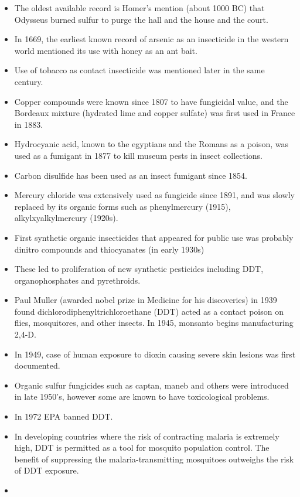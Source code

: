 \documentclass[
  openany]{book}
\providecommand{\tightlist}{%
  \setlength{\itemsep}{0pt}\setlength{\parskip}{0pt}}
\begin{document}
\begin{itemize}
\tightlist
\item
  The oldest available record is Homer's mention (about 1000 BC) that Odysseus burned sulfur to purge the hall and the house and the court.
\item
  In 1669, the earliest known record of arsenic as an insecticide in the western world mentioned its use with honey as an ant bait.
\item
  Use of tobacco as contact insecticide was mentioned later in the same century.
\item
  Copper compounds were known since 1807 to have fungicidal value, and the Bordeaux mixture (hydrated lime and copper sulfate) was first used in France in 1883.
\item
  Hydrocyanic acid, known to the egyptians and the Romans as a poison, was used as a fumigant in 1877 to kill museum pests in insect collections.
\item
  Carbon disulfide has been used as an insect fumigant since 1854.
\item
  Mercury chloride was extensively used as fungicide since 1891, and was slowly replaced by its organic forms such as phenylmercury (1915), alkylxyalkylmercury (1920s).
\item
  First synthetic organic insecticides that appeared for public use was probably dinitro compounds and thiocyanates (in early 1930s)
\item
  These led to proliferation of new synthetic pesticides including DDT, organophosphates and pyrethroids.
\item
  Paul Muller (awarded nobel prize in Medicine for his discoveries) in 1939 found dichlorodiphenyltrichloroethane (DDT) acted as a contact poison on flies, mosquitores, and other insects. In 1945, monsanto begins manufacturing 2,4-D.
\item
  In 1949, case of human exposure to dioxin causing severe skin lesions was first documented.
\item
  Organic sulfur fungicides such as captan, maneb and others were introduced in late 1950's, however some are known to have toxicological problems.
\item
  In 1972 EPA banned DDT.
\item
  In developing countries where the risk of contracting malaria is extremely high, DDT is permitted as a tool for mosquito population control. The benefit of suppressing the malaria-transmitting mosquitoes outweighs the risk of DDT exposure.
\item

\end{itemize}
\end{document}
